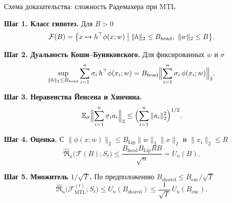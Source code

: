 \documentclass[10pt,pdf,hyperref={unicode}]{beamer}
\begin{document}
\begin{frame}{Схема доказательства: сложность Радемахера при MTL}
\justifying
\footnotesize

\textbf{Шаг 1. Класс гипотез.} Для $B>0$
\[
    \mathcal{F}(B) = \bigl\{x \mapsto h^{\top}\phi(x;w) \bigm| \|h\|_2 \le B_{\mathrm{head}},\ \|w\|_2 \le B\bigr\}.
\]

\textbf{Шаг 2. Дуальность Коши--Буняковского.} Для фиксированных $w$ и $\sigma$
\[
    \sup_{\|h\|_2 \le B_{\mathrm{head}}}\sum_{i=1}^{n}\sigma_i\, h^{\top}\phi(x_i;w) = B_{\mathrm{head}}\Bigl\|\sum_{i=1}^{n}\sigma_i\, \phi(x_i;w)\Bigr\|_2.
\]

\textbf{Шаг 3. Неравенства Йенсена и Хинчина.}
\[
    \mathbb{E}_{\sigma}\Bigl\|\sum_{i=1}^{n}\sigma_i a_i\Bigr\|_2 \le \Bigl(\sum_{i=1}^{n}\|a_i\|_2^2\Bigr)^{1/2}.
\]

\textbf{Шаг 4. Оценка.} С $\|\phi(x;w)\|_2 \le B_{\mathrm{Lip}}\|w\|_2\|x\|_2$ и $\|x_i\|_2 \le R$
\[
    \widehat{\mathfrak R}_n\bigl(\mathcal{F}(B);S_t\bigr) \le \frac{B_{\mathrm{head}}B_{\mathrm{Lip}}RB}{\sqrt{n}} = U_n(B).
\]

\textbf{Шаг 5. Множитель $1/\sqrt{T}$.} По предположению $B_{\mathrm{shared}} \le B_{\mathrm{enc}}/\sqrt{T}$
\[
    \widehat{\mathfrak R}_n\bigl(\mathcal{F}_{\mathrm{MTL}}^{(t)};S_t\bigr) \le U_n(B_{\mathrm{shared}}) \le \frac{1}{\sqrt{T}}\,U_n(B_{\mathrm{enc}}).
\]

\end{frame}
\end{document}
